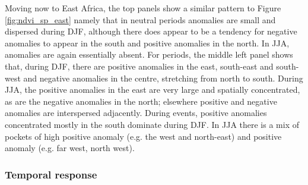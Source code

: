 Moving now to East Africa, the top panels show a similar pattern to
Figure \ref{fig:ndvi_sp_east} namely that in neutral periods anomalies
are small and dispersed during DJF, although there does appear to be a
tendency for negative anomalies to appear in the south and positive
anomalies in the north. In JJA, anomalies are again essentially
absent. For \elnino{} periods, the middle left panel shows that, during
DJF, there are positive anomalies in the east, south-east and
south-west and negative anomalies in the centre, stretching from north
to south. During JJA, the positive anomalies in the east are very
large and spatially concentrated, as are the negative anomalies in the
north; elsewhere positive and negative anomalies are interspersed
adjacently. During \nina{} events, positive anomalies concentrated
mostly in the south dominate during DJF. In JJA there is a mix of
pockets of high positive anomaly (e.g. the west and north-east) and
positive anomaly (e.g. far west, north west).

\subsubsection{Temporal response}

